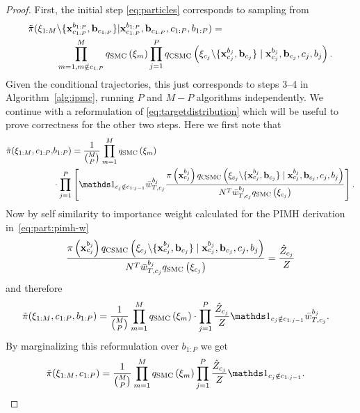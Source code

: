 \begin{proof}
	First, the initial step \eqref{eq:particles} corresponds to sampling from
	\begin{align*}
	\tilde\pi(\mathbf{\xi}_{1:M} &\backslash\{\mathbf{x}_{c_{1:P}}^{b_{1:P}}, \mathbf{b}_{c_{1:P}} \} | \mathbf{x}_{c_{1:P}}^{b_{1:P}}, \mathbf{b}_{c_{1:P}},c_{1:P}, b_{1:P}) = \\ 
	& \prod_{m=1,m\notin c_{1:P}}^M q_{\text{SMC}}\left(\mathbf{\xi}_m\right) \prod_{j = 1}^P q_{\text{CSMC}}\left(\mathbf{\xi}_{c_j} \backslash \{\mathbf{x}_{c_j}^{b_j}, \mathbf{b}_{c_j}\} \mid \mathbf{x}_{c_j}^{b_j}, \mathbf{b}_{c_j}, c_j, b_j \right).
	\end{align*}
	Given the conditional trajectories, this just corresponds to steps 3--4 in Algorithm~\ref{alg:ipmc}, 
	\ie running $P$ \csmc and $M-P$ \smc algorithms independently.
	We continue with a reformulation of \eqref{eq:targetdistribution} which will be useful to prove correctness for the other two steps.
	Here we first note that
	\begin{align}
	\tilde \pi (\xib_{1:M},  c_{1:P}, & b_{1:P})=\frac{1}{\binom{M}{P}} \prod_{m=1}^M q_{\text{SMC}}\left(\xib_m\right) \nonumber\\ &\cdot
	\prod_{j = 1}^P \left[
	\iden_{c_j \notin c_{1:j-1}} \nw_{T,c_j}^{b_j}
	\frac{\pi\left(\xb_{c_j}^{b_j}\right) q_{\text{CSMC}}\left(\xib_{c_j} \backslash \{\xb_{c_j}^{b_j}, \bb_{c_j}\} \mid 
		\xb_{c_j}^{b_j}, \bb_{c_j}, c_j, b_j \right)}{N^{T} \nw_{T,c_j}^{b_j}q_{\text{SMC}}\left(\xib_{c_j}\right)}\right].
	\end{align}
	Now by self similarity to importance weight calculated for the PIMH derivation in~\eqref{eq:part:pimh-w}
	\begin{align}
	\frac{\pi\left(\mathbf{x}_{c_j}^{b_j}\right) q_{\text{CSMC}}\left(\mathbf{\xi}_{c_j} \backslash \{\mathbf{x}_{c_j}^{b_j}, \mathbf{b}_{c_j}\} \mid 
		\mathbf{x}_{c_j}^{b_j}, \mathbf{b}_{c_j}, c_j, b_j \right)}{N^{T} \bar w_{T,c_j}^{b_j}q_{\text{SMC}}\left(\mathbf{\xi}_{c_j}\right)}
	= \frac{\hat Z_{c_j}}{Z}
	\end{align}
	and therefore
	\begin{align}
		\label{eq:reformtargetdist}
	\tilde \pi (\xib_{1:M},  c_{1:P}, b_{1:P}) &= \frac{1}{\binom{M}{P}} \prod_{m=1}^M q_{\text{SMC}}\left(\xib_m\right) \cdot \prod_{j = 1}^P \frac{\hat Z_{c_j}}{Z}\iden_{c_j \notin c_{1:j-1}} 
	\nw_{T,c_j}^{b_j}.
	\end{align}
	By marginalizing this reformulation over $b_{1:P}$ we get
	\begin{align*}
	\tilde\pi(\xib_{1:M}, c_{1:P}) 
	&= \frac{1}{\binom{M}{P}} \prod_{m=1}^M q_{\text{SMC}}\left(\xib_m\right) \prod_{j = 1}^P \frac{\hat Z_{c_j}}{Z}\iden_{c_j \notin c_{1:j-1}} .\nonumber

\end{align*}
\end{proof}
